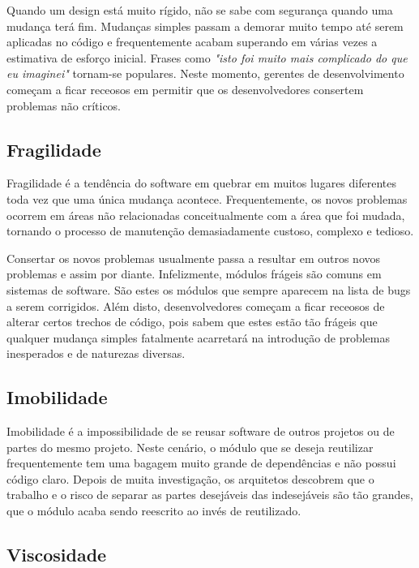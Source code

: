 Quando um design está muito rígido, não se sabe com segurança quando uma 
mudança terá fim. Mudanças simples passam a demorar muito tempo até serem 
aplicadas no código e frequentemente acabam superando em várias vezes a 
estimativa de esforço inicial. 
Frases como \textit{"isto foi muito mais complicado do que eu imaginei"} 
tornam-se populares. Neste momento, gerentes de desenvolvimento começam a ficar
receosos em permitir que os desenvolvedores consertem problemas não críticos.

\subsection{Fragilidade}
\label{subsec:fragilidade}

Fragilidade é a tendência do software em quebrar em muitos lugares diferentes 
toda vez que uma única mudança acontece. Frequentemente, os novos problemas
ocorrem  em áreas não relacionadas conceitualmente com a área que foi mudada, 
tornando o processo de manutenção demasiadamente custoso, complexo e tedioso. 

Consertar os novos problemas usualmente passa a resultar em outros novos
problemas e assim por diante. Infelizmente, módulos frágeis são comuns em
sistemas de software. São estes os módulos que sempre aparecem na lista de bugs
a serem corrigidos. 
Além disto, desenvolvedores começam a ficar receosos de alterar certos trechos 
de código, pois sabem que estes estão tão frágeis que qualquer mudança simples 
fatalmente acarretará na introdução de problemas inesperados e de naturezas
diversas.

\subsection{Imobilidade}

Imobilidade é a impossibilidade de se reusar software de outros projetos ou de
partes do mesmo projeto. Neste cenário, o módulo que se deseja reutilizar 
frequentemente tem uma bagagem muito grande de dependências e não possui código 
claro. 
Depois de muita investigação, os arquitetos descobrem que o trabalho e o risco 
de separar as partes desejáveis das indesejáveis são tão grandes, que o módulo 
acaba sendo reescrito ao invés de reutilizado.

\subsection{Viscosidade}

